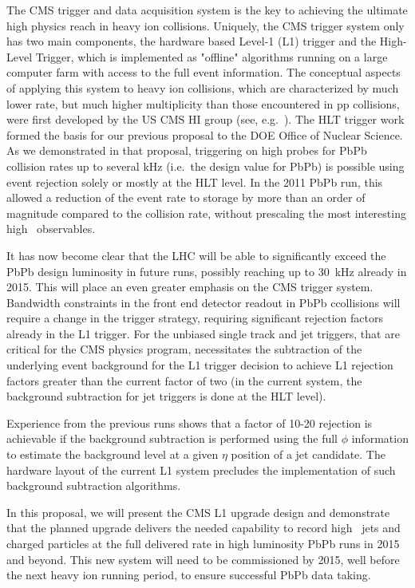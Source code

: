 The CMS trigger and data acquisition system is the key to achieving the ultimate high \pt physics reach in heavy ion collisions.
Uniquely, the CMS trigger system only has two main components, the hardware based Level-1 (L1) trigger and the High-Level Trigger,
which is implemented as "offline" algorithms running on a large computer farm with access to the full event information. 
The conceptual aspects of applying this system 
to heavy ion collisions, which are characterized by much lower rate, but much higher multiplicity than those encountered in 
pp collisions, were first developed by the US CMS HI group (see, e.g.\ \cite{Roland:2007is}). The HLT trigger work 
formed the basis for our 
previous proposal to the DOE Office of Nuclear Science. As we demonstrated in that proposal, triggering on high \pt probes for
PbPb collision rates up to several kHz (i.e.\ the design value for PbPb) is possible using event rejection 
solely or mostly at the HLT level. In the 2011 PbPb run, this allowed a reduction of the event rate to storage by more than
an order of magnitude compared to the collision rate, without prescaling the most interesting high \pt\ observables.


It has now become clear that the LHC will be able to significantly exceed the PbPb design luminosity in future runs,
possibly reaching up to 30~kHz already in 2015. This will place an even greater 
emphasis on the CMS trigger system. Bandwidth constraints in the front end detector readout in PbPb ccollisions will
require a change in the trigger strategy, requiring significant rejection factors
already in the L1 trigger. For the unbiased single track and jet triggers, that are critical for the CMS physics program, 
necessitates the subtraction of the underlying event background for the L1 trigger decision to achieve
L1 rejection factors greater than the current factor of two (in the current system, the background subtraction
for jet triggers is done at the HLT level).

Experience from the previous runs shows that a factor of 10-20 rejection is achievable if the background subtraction 
is performed using the full $\phi$ information to estimate the background level at a given $\eta$ position 
of a jet candidate. The hardware layout of the current L1 system precludes the implementation of such background 
subtraction algorithms. 

In this proposal, we will present the CMS L1 upgrade design and demonstrate that the planned upgrade delivers 
the needed capability to record high \pt\ jets and charged particles at the full delivered rate in high luminosity 
PbPb runs in 2015 and beyond.  This new system will need to be commissioned by 2015, well before the next heavy ion running period,
to ensure successful PbPb data taking.  

